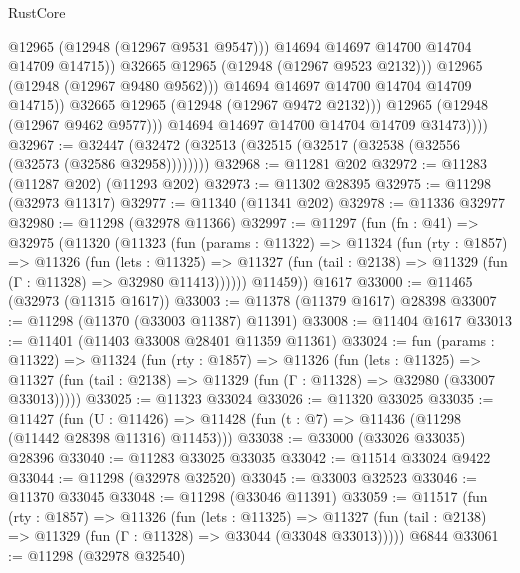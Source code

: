 \begin{lexlean}{RustCore}
\begin{coremodule}
                              @12965
                              (@12948 (@12967 @9531 @9547)))
                            @14694
                            @14697
                            @14700
                            @14704
                            @14709
                            @14715))
                        @32665
                        @12965
                        (@12948 (@12967 @9523 @2132)))
                      @12965
                      (@12948 (@12967 @9480 @9562)))
                    @14694
                    @14697
                    @14700
                    @14704
                    @14709
                    @14715))
                @32665
                @12965
                (@12948 (@12967 @9472 @2132)))
              @12965
              (@12948 (@12967 @9462 @9577)))
            @14694
            @14697
            @14700
            @14704
            @14709
            @31473))))
@32967 := @32447 (@32472 (@32513 (@32515 (@32517 (@32538 (@32556 (@32573 (@32586 @32958))))))))
@32968 := @11281 @202
@32972 := @11283 (@11287 @202) (@11293 @202)
@32973 := @11302 @28395
@32975 := @11298 (@32973 @11317)
@32977 := @11340 (@11341 @202)
@32978 := @11336 @32977
@32980 := @11298 (@32978 @11366)
@32997 := @11297
    (fun (fn : @41) =>
    @32975
      (@11320
        (@11323
          (fun (params : @11322) =>
          @11324
            (fun (rty : @1857) =>
            @11326
              (fun (lets : @11325) =>
              @11327 (fun (tail : @2138) => @11329 (fun (Γ : @11328) => @32980 @11413))))))
        @11459))
    @1617
@33000 := @11465 (@32973 (@11315 @1617))
@33003 := @11378 (@11379 @1617) @28398
@33007 := @11298 (@11370 (@33003 @11387) @11391)
@33008 := @11404 @1617
@33013 := @11401 (@11403 @33008 @28401 @11359 @11361)
@33024 := fun (params : @11322) =>
  @11324
    (fun (rty : @1857) =>
    @11326
      (fun (lets : @11325) =>
      @11327 (fun (tail : @2138) => @11329 (fun (Γ : @11328) => @32980 (@33007 @33013)))))
@33025 := @11323 @33024
@33026 := @11320 @33025
@33035 := @11427
    (fun (U : @11426) => @11428 (fun (t : @7) => @11436 (@11298 (@11442 @28398 @11316) @11453)))
@33038 := @33000 (@33026 @33035) @28396
@33040 := @11283 @33025 @33035
@33042 := @11514 @33024 @9422
@33044 := @11298 (@32978 @32520)
@33045 := @33003 @32523
@33046 := @11370 @33045
@33048 := @11298 (@33046 @11391)
@33059 := @11517
    (fun (rty : @1857) =>
    @11326
      (fun (lets : @11325) =>
      @11327 (fun (tail : @2138) => @11329 (fun (Γ : @11328) => @33044 (@33048 @33013)))))
    @6844
@33061 := @11298 (@32978 @32540)

\end{coremodule}
\end{lexlean}

